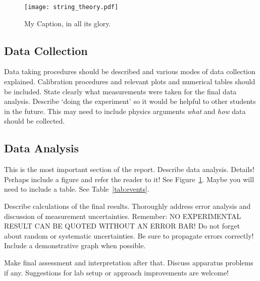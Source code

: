 \documentclass[12pt,letterpaper,onecolumn]{article}
\begin{document}

\begin{figure}[h]
 \begin{center}
 \texttt{[image: string\_theory.pdf]}
 \caption{ My Caption, in all its glory.\label{fig:apparatus} }
 \end{center}
\end{figure}

\subsection{Data Collection}

Data taking procedures should be described and various modes of
data collection explained. Calibration procedures and
relevant plots and numerical tables should be included.
State clearly what measurements were taken for the final
data analysis. Describe `doing the experiment' so it would
be helpful to other students in the future. This may need
to include physics arguments {\em what } and {\em how } data should
be collected.


\subsection{Data Analysis}

This is the most important section of the report.
Describe data analysis. Details! Perhaps include a figure and refer
the reader to it! See Figure~\ref{fig:apparatus}. Maybe you will need
to include a table. See Table~\ref{tab:events}.

Describe calculations of the final results.
Thoroughly address error analysis and discussion of measurement
uncertainties. Remember: NO EXPERIMENTAL RESULT CAN BE QUOTED
WITHOUT AN ERROR BAR! Do not forget about random or systematic
uncertainties. Be sure to propagate errors correctly!
Include a demonstrative graph when possible.


Make final assessment and interpretation after that.
Discuss apparatus problems if any. Suggestions for
lab setup or approach improvements are welcome!
\end{document}
